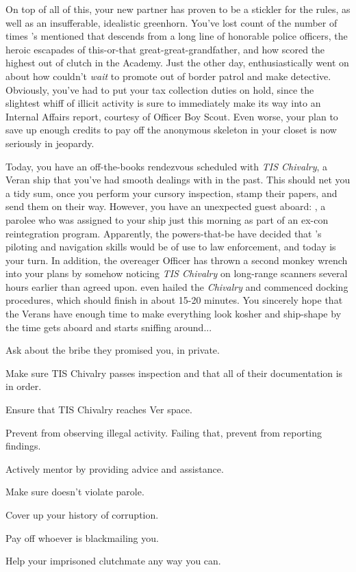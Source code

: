 \documentclass[char]{guildcamp4}
\begin{document}
On top of all of this, your new partner \cCgood{} has proven to be a stickler for the rules, as well as an insufferable, idealistic greenhorn. You've lost count of the number of times \cCgood{\they}'s mentioned that \cCgood{\they} descends from a long line of honorable police officers, the heroic escapades of this-or-that great-great-grandfather, and how \cCgood{\they} scored the highest out of \cCgood{\their} clutch in the Academy. Just the other day, \cCgood{\they} enthusiastically went on about how \cCgood{\they} couldn't \textit{wait} to promote out of border patrol and make detective. Obviously, you've had to put your tax collection duties on hold, since the slightest whiff of illicit activity is sure to immediately make its way into an Internal Affairs report, courtesy of Officer Boy Scout. Even worse, your plan to save up enough credits to pay off the anonymous skeleton in your closet is now seriously in jeopardy.

Today, you have an off-the-books rendezvous scheduled with \textit{TIS Chivalry}, a Veran ship that you've had smooth dealings with in the past. This should net you a tidy sum, once you perform your cursory inspection, stamp their papers, and send them on their way. However, you have an unexpected guest aboard: \cPilot{}, a parolee who was assigned to your ship just this morning as part of an ex-con reintegration program. Apparently, the powers-that-be have decided that \cPilot{}'s piloting and navigation skills would be of use to law enforcement, and today is your turn. In addition, the overeager Officer \cCgood{} has thrown a second monkey wrench into your plans by somehow noticing \textit{TIS Chivalry} on long-range scanners several hours earlier than agreed upon. \cCgood{\They} even hailed the \textit{Chivalry} and commenced docking procedures, which should finish in about 15-20 minutes. You sincerely hope that the Verans have enough time to make everything look kosher and ship-shape by the time \cCgood{} gets aboard and starts sniffing around...

\begin{itemz}[Goals]
	\item Ask \cVone{} about the bribe they promised you, in private.
	\item Make sure TIS Chivalry passes inspection and that all of their documentation is in order.
	\item Ensure that TIS Chivalry reaches Ver space.
	\item Prevent \cCgood{} from observing illegal activity. Failing that, prevent \cCgood{\them} from reporting \cCgood{\their} findings.
	\item Actively mentor \cCgood{} by providing advice and assistance.
	\item Make sure \cPilot{} doesn't violate  parole. 
	\item Cover up your history of corruption.
	\item Pay off whoever is blackmailing you.
	\item Help your imprisoned clutchmate any way you can.
\end{itemz}
\end{document}
